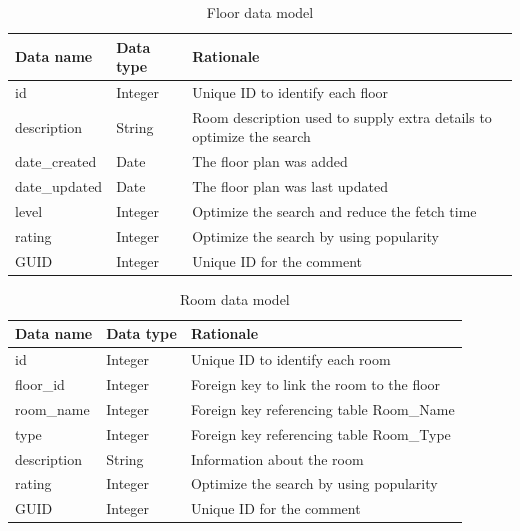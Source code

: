 \documentclass{sig-alt-release2}
\begin{document}
\begin{table}
\begin{tabular}{| p{2cm} | p{2cm} | p{3cm}|}
\hline
Data name & Data type & Rationale \\
\hline
id & Integer & Unique ID to identify each floor \\
\hline
description & String & Room description used to supply extra details to optimize the search\\
\hline
date\_created & Date & The floor plan was added\\
\hline
date\_updated & Date & The floor plan was last updated\\
\hline
level & Integer & Optimize the search and reduce the fetch time\\
\hline
rating & Integer & Optimize the search by using popularity\\
\hline
GUID & Integer & Unique ID for the comment\\
\hline
\end{tabular}	
\caption{Floor data model}
\end{table}



\begin{table}
\begin{tabular}{| p{2cm} | p{2cm} | p{3cm}|}
\hline
Data name & Data type & Rationale \\
\hline
id & Integer & Unique ID to identify each room \\
\hline
floor\_id & Integer & Foreign key to link the room to the floor\\
\hline
room\_name & Integer & Foreign key referencing table Room\_Name\\
\hline
type & Integer & Foreign key referencing table Room\_Type \\
\hline
description & String & Information about the room\\
\hline
rating & Integer & Optimize the search by using popularity\\
\hline
GUID & Integer & Unique ID for the comment\\
\hline
\end{tabular}	
\caption{Room data model}
\end{table}
\end{document}

